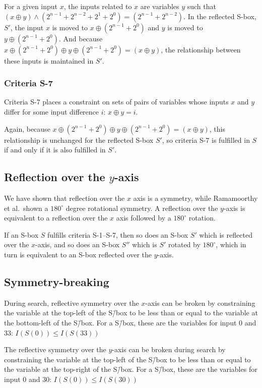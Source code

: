 For a given input $x$, the inputs related to $x$ are
variables $y$ such that 
$(x \oplus y) \land (2^{n-1} + 2^{n-2} + 2^1 + 2^0) = (2^{n-1} + 2^{n-2})$.
In the reflected S-box, $S'$, the input $x$ is moved to 
$x \oplus (2^{n-1} + 2^0)$ 
and 
$y$ is moved to 
$y \oplus (2^{n-1} + 2^0)$.
And because 
$x \oplus (2^{n-1} + 2^0) \oplus y \oplus (2^{n-1} + 2^0) = (x \oplus y)$, 
the relationship between these inputs is maintained in $S'$.

\subsubsection{Criteria S-7}
Criteria S-7 places a constraint on sets of pairs of variables whose inputs $x$ and $y$ 
differ for some input difference $i$: $x \oplus y = i$. 

Again, because
$x \oplus (2^{n-1} + 2^0) \oplus y \oplus (2^{n-1} + 2^0) = (x \oplus y)$,
this relationship is unchanged for the reflected S-box $S'$,
so criteria S-7 is fulfilled in $S$ if and only if it is also fulfilled in $S'$.

\subsection{Reflection over the $y$-axis}

We have shown that reflection over the $x$ axis is a symmetry, while
Ramamoorthy et al.\ shown a $180^{\circ}$ degree rotational symmetry.
A reflection over the $y$-axis is equivalent to a reflection over the $x$ axis 
followed by a $180^{\circ}$ rotation.

If an S-box $S$ fulfills criteria S-1--S-7, 
then so does an S-box $S'$ which is reflected over the $x$-axis,
and so does an S-box $S''$ which is $S'$ rotated by $180^{\circ}$, 
which in turn is equivalent to an S-box reflected over the $y$-axis.

\subsection{Symmetry-breaking}
\label{sec:breakreflection}

During search, reflective symmetry over the $x$-axis 
can be broken by constraining the variable 
at the top-left of the S\=/box to be less than or equal to the 
variable at the bottom-left of the S\=/box.
For a \sixbyfour{} S\=/box, these are the variables for
input $0$ and $33$:
$I(S(0)) \leq I(S(33))$

The reflective symmetry over the $y$-axis can be broken during search
by constraining the variable at the top-left of the
S\=/box to be less than or equal to
the variable at the top-right of the S\=/box.
For a \sixbyfour{} S\=/box, these are the variables for
input $0$ and $30$:
$I(S(0)) \leq I(S(30))$
